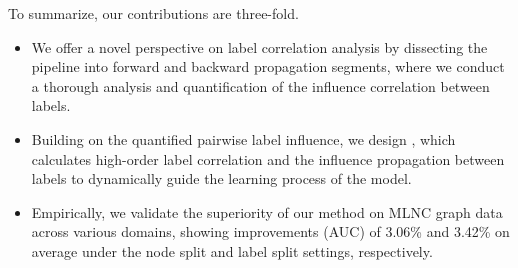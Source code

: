 
To summarize, our contributions are three-fold.
\begin{itemize}[leftmargin=*]
\item We offer a novel perspective on label correlation analysis by dissecting the pipeline into forward and backward propagation segments, where we conduct a thorough analysis and quantification of the influence correlation between labels.

\item Building on the quantified pairwise label influence, we design \model, which calculates high-order label correlation and the influence propagation between labels to dynamically guide the learning process of the model.

\item Empirically, we validate the superiority of our method on MLNC graph data across various domains, showing improvements (AUC) of 3.06\% and 3.42\% on average under the node split and label split settings, respectively.
\end{itemize}











